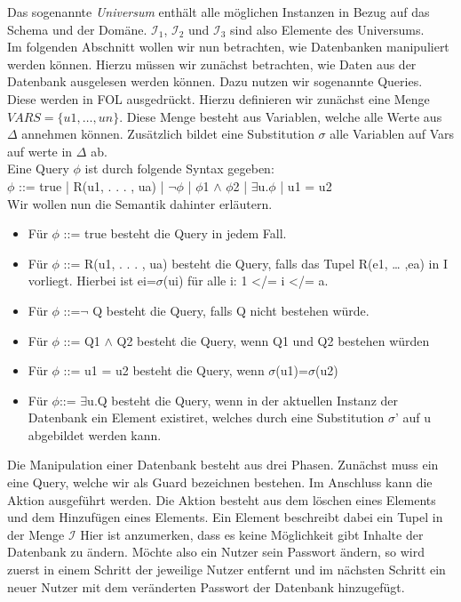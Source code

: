 Das sogenannte  \emph{Universum} enthält alle möglichen Instanzen in Bezug auf das Schema und der Domäne. $\mathcal{I}_1$, $\mathcal{I}_2$ und $\mathcal{I}_3$ sind also Elemente des Universums.\\
Im folgenden Abschnitt wollen wir nun betrachten, wie Datenbanken manipuliert werden können. 
Hierzu müssen wir zunächst betrachten, wie Daten aus der Datenbank ausgelesen werden können. 
Dazu nutzen wir sogenannte Queries. Diese werden in FOL ausgedrückt. Hierzu definieren wir zunächst eine Menge $VARS = \{u1,…,un\}$. Diese Menge besteht aus Variablen, welche alle Werte aus ${\Delta}$ annehmen können. Zusätzlich bildet eine Substitution ${\sigma}$ alle Variablen auf Vars auf werte in ${\Delta}$ ab. \\
 Eine Query ${\phi}$ ist durch folgende Syntax gegeben: \\
${\phi}$ ::= true | R(u1, . . . , ua) | ${\neg}{\phi}$ | ${\phi}$1 $\wedge$ ${\phi}$2 | $\exists$u.${\phi}$ | u1 = u2 \\
Wir wollen nun die Semantik dahinter erläutern.
\begin{itemize}
\item Für ${\phi}$ ::= true besteht die Query in jedem Fall.
\item Für ${\phi}$ ::= R(u1, . . . , ua) besteht die Query, falls das Tupel R(e1, … ,ea) in I vorliegt. Hierbei ist ei=${\sigma}$(ui) für alle i: 1 </= i </= a.
\item Für ${\phi}$ ::=${\neg}$ Q besteht die Query, falls Q nicht bestehen würde. 
\item Für ${\phi}$ ::= Q1 $\wedge$ Q2 besteht die Query, wenn Q1 und Q2  bestehen würden
\item Für ${\phi}$ ::= u1 = u2  besteht die Query, wenn ${\sigma}$(u1)=${\sigma}$(u2)
\item Für ${\phi}$::= $\exists$u.Q besteht die Query, wenn in der aktuellen Instanz der Datenbank ein Element existiret, welches durch eine Substitution  ${\sigma}$' auf u abgebildet werden kann. 
\end{itemize}
Die Manipulation einer Datenbank besteht aus drei Phasen. Zunächst muss ein eine Query, welche wir als Guard bezeichnen bestehen. Im Anschluss kann die Aktion ausgeführt werden. Die Aktion besteht aus dem löschen eines Elements und dem Hinzufügen eines Elements. Ein Element beschreibt dabei ein Tupel in der Menge $\mathcal{I}$ Hier ist anzumerken, dass es keine Möglichkeit gibt Inhalte der Datenbank zu ändern. Möchte also ein Nutzer sein Passwort ändern, so wird zuerst in einem Schritt der jeweilige Nutzer entfernt und im nächsten Schritt ein neuer Nutzer mit dem veränderten Passwort der Datenbank hinzugefügt.









